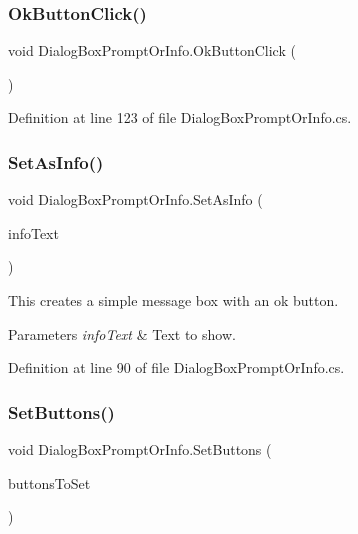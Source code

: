 \subsubsection{\texorpdfstring{Ok\+Button\+Click()}{OkButtonClick()}}
{\footnotesize\ttfamily void Dialog\+Box\+Prompt\+Or\+Info.\+Ok\+Button\+Click (\begin{DoxyParamCaption}{ }\end{DoxyParamCaption})}



Definition at line 123 of file Dialog\+Box\+Prompt\+Or\+Info.\+cs.

\mbox{\label{class_dialog_box_prompt_or_info_a591120ef3e537b3c237cffa980db3fdf}} 
\subsubsection{\texorpdfstring{Set\+As\+Info()}{SetAsInfo()}}
{\footnotesize\ttfamily void Dialog\+Box\+Prompt\+Or\+Info.\+Set\+As\+Info (\begin{DoxyParamCaption}\item[{string}]{info\+Text }\end{DoxyParamCaption})}



This creates a simple message box with an ok button. 


\begin{DoxyParams}{Parameters}
{\em info\+Text} & Text to show.\\
\hline
\end{DoxyParams}


Definition at line 90 of file Dialog\+Box\+Prompt\+Or\+Info.\+cs.

\mbox{\label{class_dialog_box_prompt_or_info_a451eae3b87295695885d74c3cab62e47}} 
\subsubsection{\texorpdfstring{Set\+Buttons()}{SetButtons()}\hspace{0.1cm}{\footnotesize\ttfamily [1/2]}}
{\footnotesize\ttfamily void Dialog\+Box\+Prompt\+Or\+Info.\+Set\+Buttons (\begin{DoxyParamCaption}\item[{params \hyperlink{_dialog_box_result_8cs_acd933b66f7b1c8ad36ee61780622c54f}{Dialog\+Box\+Result} \mbox{[}$\,$\mbox{]}}]{buttons\+To\+Set }\end{DoxyParamCaption})}



